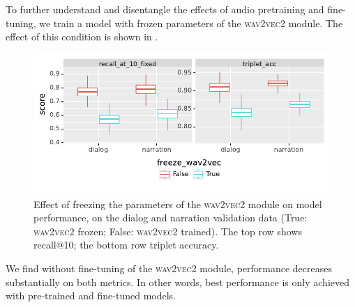 To further understand and disentangle the effects of audio pretraining and 
fine-tuning, we train a model with frozen parameters of the 
\textsc{wav2vec2} module. The effect of this condition is shown in .
\begin{figure}[htb]
  \centering
  \includegraphics[width=\columnwidth]{results/ablations/freeze_wav2vec.pdf}
  \caption{Effect of freezing the parameters of the \textsc{wav2vec2}
    module on model performance, on the dialog and narration
    validation data (True: \textsc{wav2vec2} frozen; False:
    \textsc{wav2vec2} trained). The top row
    shows recall@10; the bottom row triplet accuracy.}
  \label{fig:freeze_wav2vec}
\end{figure}
We find without fine-tuning of the \textsc{wav2vec2} module, performance 
decreases substantially on both metrics. In other words, best 
performance is only achieved with pre-trained and fine-tuned models.


